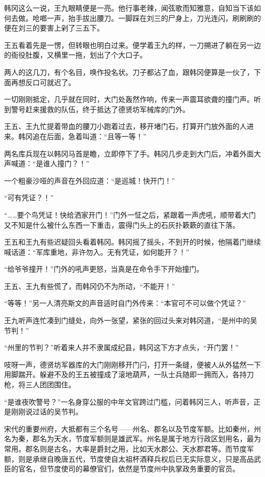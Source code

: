 韩冈这么一说，王九眼睛便是一亮。他行事老辣，闻弦歌而知雅意，自知当下该如何去做。呛啷一声，抬手拔出腰刀。一脚踩在刘三的尸身上，刀光连闪，刷刷刷的便在刘三的要害上剁了三五下。

王五看着先是一愣，但转眼也明白过来。便学着王九的样，一刀搠进了躺在另一边的衙役肚腹，又横里一拖，划出了个大口子。

两人的这几刀，有个名目，唤作投名状。刀子都沾了血，跟韩冈便算是一伙了，下面再想反口可就迟了。

一切刚刚抵定，几乎就在同时，大门处轰然作响，传来一声震耳欲聋的撞门声。听到警号赶来援救的队伍，终于抵达了德贤坊军械库的门外。

王五、王九忙提着带血的腰刀小跑着过去，移开堵门石，打算开门放外面的人进来。韩冈追在后面，急着叫道：“且等一等！”

两名库兵现在以韩冈马首是瞻，立即停下了手。韩冈几步走到大门后，冲着外面大声喊道：“是谁人撞门？！”

一个粗豪沙哑的声音在外回应道：“是巡城！快开门！”

“可有凭证？！”

“……要个鸟凭证！快给洒家开门！”门外一怔之后，紧跟着一声虎吼，顺带着大门又不知是什么被什么东西一下重击，震得门头上的石灰扑簌簌的直往下落。

王五和王九有些迟疑回头看着韩冈。韩冈摇了摇头，不到开的时候，他隔着门继续喊话道：“军库重地，非许勿入。无有凭证，如何能开？！”

“给爷爷撞开！”门外的吼声更怒，当真是在命令手下开始撞门。

王五、王九有些慌了，而韩冈仍不为所动，“不能开！”

“等等！”另一人清亮斯文的声音适时自门外传来：“本官可不可以做个凭证？”

王九听声连忙凑到门缝处，向外一张望，紧张的回过头来对韩冈道，“是州中的吴节判！”

“州里的节判？”听着来人并不隶属成纪县，韩冈这下方才点头，“开门罢！”

吱呀一声，德贤坊军器库的大门刚刚移开门闩，打开一条缝，便被人从外猛然一下用脚踹开。躲避不及的王五被撞成了滚地葫芦，一队士兵随即一拥而入，各持刀枪，将三人团团围住。

“是谁夜吹警号？”一名身穿公服的中年文官跨过门槛，问着韩冈三人，听声音，正是刚刚说过话的吴节判。

宋代的重要州府，大抵都有三个名号——州名、郡名以及节度军额。比如秦州，州名为秦，郡名为天水，节度军额则是雄武军。州名是属于地方行政区划用名，最为常用。郡名则是古名，大率是爵封之用，比如天水郡公、天水郡君等。而节度军额，则是承继自晚唐五代，节度使自太祖杯酒释兵权后已无实际意义，只是高品武臣的官名，但节度使司的幕僚官们，依然是节度州中执掌政务重要的官员。

